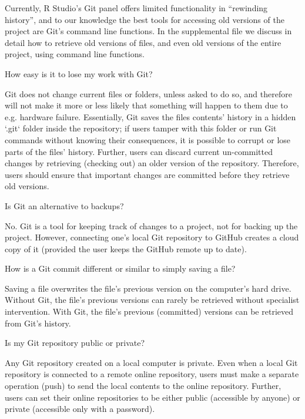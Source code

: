 \documentclass[
  american,
  ,doc,floatsintext]{apa6}
\begin{document}
Currently, R Studio's Git panel offers limited functionality in \enquote{rewinding history}, and to our knowledge the best tools for accessing old versions of the project are Git's command line functions. In the supplemental file we discuss in detail how to retrieve old versions of files, and even old versions of the entire project, using command line functions.

\begin{tcolorbox}[colframe=green!50!black, colback=green!5, fonttitle=\small\bfseries, fontupper=\small, title=Box 3. Common Git Misconceptions.]
How easy is it to lose my work with Git?
    \begin{compactitem}
    \item Git does not change current files or folders, unless asked to do so, and therefore will not make it more or less likely that something will happen to them due to e.g. hardware failure. Essentially, Git saves the files contents' history in a hidden `.git` folder inside the repository; if users tamper with this folder or run Git commands without knowing their consequences, it is possible to corrupt or lose parts of the files' history. Further, users can discard current un-committed changes by retrieving (checking out) an older version of the repository. Therefore, users should ensure that important changes are committed before they retrieve old versions.
    \end{compactitem}
\vspace{.5em}
Is Git an alternative to backups?
    \begin{compactitem}
    \item No. Git is a tool for keeping track of changes to a project, not for backing up the project. However, connecting one's local Git repository to GitHub creates a cloud copy of it (provided the user keeps the GitHub remote up to date).
    \end{compactitem}
\vspace{.5em}
How is a Git commit different or similar to simply saving a file?
    \begin{compactitem}
    \item Saving a file overwrites the file's previous version on the computer's hard drive. Without Git, the file's previous versions can rarely be retrieved without specialist intervention. With Git, the file's previous (committed) versions can be retrieved from Git's history.
    \end{compactitem}
\vspace{.5em}
Is my Git repository public or private?
    \begin{compactitem}
    \item Any Git repository created on a local computer is private. Even when a local Git repository is connected to a remote online repository, users must make a separate operation (push) to send the local contents to the online repository. Further, users can set their online repositories to be either public (accessible by anyone) or private (accessible only with a password).
    \end{compactitem}
\end{tcolorbox}
\end{document}
